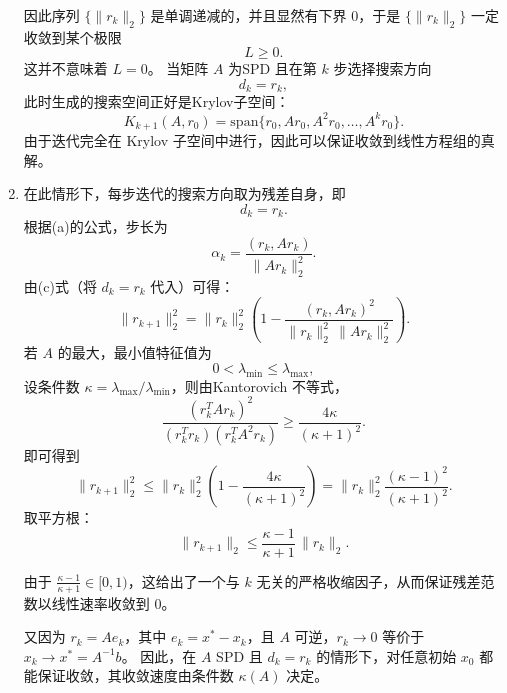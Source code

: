 \documentclass{ctexart}
\begin{document}
\begin{solution}
\begin{enumerate}
\[\]
因此序列 $\{\lVert r_k \rVert_2\}$ 是单调递减的，并且显然有下界 $0$，于是 $\{\lVert r_k \rVert_2\}$ 一定收敛到某个极限
\[
L \ge 0.
\]
这并不意味着 $L=0$。
当矩阵 $A$ 为SPD 且在第 $k$ 步选择搜索方向
\[
d_k = r_k,
\]
此时生成的搜索空间正好是Krylov子空间：
\[
K_{k+1}(A, r_0) = \mathrm{span}\{ r_0, A r_0, A^2 r_0, \dots, A^k r_0 \}.
\]
由于迭代完全在 Krylov 子空间中进行，因此可以保证收敛到线性方程组的真解。
\item 在此情形下，每步迭代的搜索方向取为残差自身，即
\[
d_k = r_k.
\]
根据(a)的公式，步长为
\[
\alpha_k = \frac{(r_k, A r_k)}{\lVert  A r_k  \rVert_2^2}.
\]
由(c)式（将 $d_k = r_k$ 代入）可得：
\[
\lVert  r_{k+1}  \rVert_2^2 = \lVert  r_k  \rVert_2^2 \left( 1 - \frac{(r_k, A r_k)^2}{\lVert  r_k  \rVert_2^2 \, \lVert  A r_k  \rVert_2^2} \right).
\]
若 $A$ 的最大，最小值特征值为
\[
0 < \lambda_{\min} \le \lambda_{\max},
\]
设条件数 $\kappa = \lambda_{\max}/\lambda_{\min}$，则由Kantorovich 不等式，
\[
\frac{(r_k^T A r_k)^2}{(r_k^T r_k)(r_k^T A^2 r_k)} \ge \frac{4\kappa}{(\kappa + 1)^2}.
\]
即可得到
\[
\lVert  r_{k+1}  \rVert_2^2 \le \lVert  r_k  \rVert_2^2 \left( 1 - \frac{4 \kappa}{(\kappa + 1)^2} \right) 
= \lVert  r_k  \rVert_2^2 \frac{(\kappa - 1)^2}{(\kappa + 1)^2}.
\]
取平方根：
\[
\lVert  r_{k+1}  \rVert_2 \le \frac{\kappa - 1}{\kappa + 1} \, \lVert  r_k  \rVert_2.
\]

由于 $\frac{\kappa - 1}{\kappa + 1} \in [0,1)$，这给出了一个与 $k$ 无关的严格收缩因子，从而保证残差范数以线性速率收敛到 $0$。  

又因为 $r_k = A e_k$，其中 $e_k = x^* - x_k$，且 $A$ 可逆，$r_k \to 0$ 等价于 $x_k \to x^* = A^{-1} b$。
因此，在 $A$ SPD 且 $d_k = r_k$ 的情形下，对任意初始 $x_0$ 都能保证收敛，其收敛速度由条件数 $\kappa(A)$ 决定。
 \end{enumerate}
\end{solution}
\end{document}
